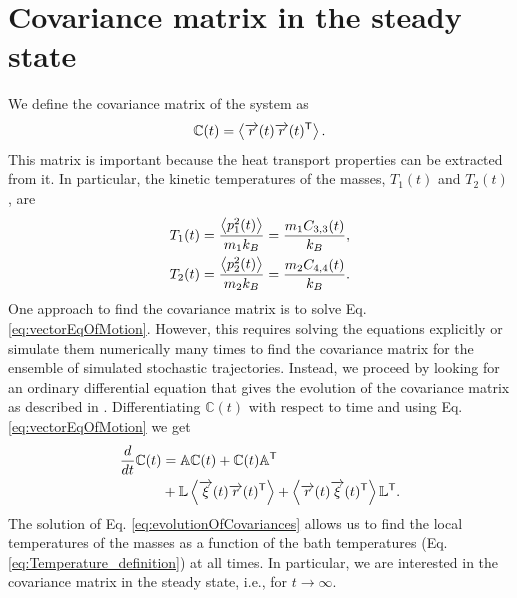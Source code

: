 \section{Covariance matrix in the steady state\label{sec:covMatrix}}
%
%
%
%
%
%
We define the covariance matrix of the system as
%
\begin{equation}
\mathbb{C}(t) = \expval{\overrightarrow{r}(t)\overrightarrow{r}(t)^\mathsf{T}}.
\end{equation}
%
This matrix is important because the heat transport properties can be extracted from it. In particular, the kinetic temperatures of the masses, $T_1(t)$ and  $T_2(t)$, are
%
\begin{align}
  T_1(t) &= \frac{\expval{ p_1^2(t)}}{m_1 k_B} = \frac{m_1 C_{3,3}(t)}{k_B},
  \nonumber\\
   T_2(t) &= \frac{\expval{ p_2^2(t)}}{m_2 k_B} = \frac{m_2 C_{4,4}(t)}{k_B}.
  \label{eq:Temperature_definition}
\end{align}
%
One approach to find the covariance matrix is to solve Eq. \eqref{eq:vectorEqOfMotion}. However, this requires solving the equations explicitly or simulate them numerically many times to find the covariance matrix for the ensemble of simulated stochastic trajectories. Instead, we proceed by looking for an ordinary differential equation that gives the evolution of the covariance matrix as described in \cite{Sarkka2019,Rieder1967,Casher1971}. Differentiating $\mathbb{C}(t)$ with respect to time and using Eq. \eqref{eq:vectorEqOfMotion} we get
%
\begin{align}
  \frac{d}{dt}\mathbb{C}(t) &=
  \mathbb{A}\mathbb{C}(t) +
  \mathbb{C}(t) \mathbb{A}^\mathsf{T}
  \nonumber\\
  &+
  \mathbb{L}\expval{ \overrightarrow{\xi}(t)\overrightarrow{r}(t)^\mathsf{T}}
+
  \expval{ \overrightarrow{r}(t)\overrightarrow{\xi}(t)^\mathsf{T}}\mathbb{L}^\mathsf{T}.
  \label{eq:evolutionOfCovariances}
\end{align}
%
The solution of Eq. \eqref{eq:evolutionOfCovariances} allows us to find the local temperatures of the masses as a function of the bath temperatures (Eq. \eqref{eq:Temperature_definition}) at all times. In particular, we are interested in the covariance matrix in the steady state, i.e., for $t\to \infty$. %

